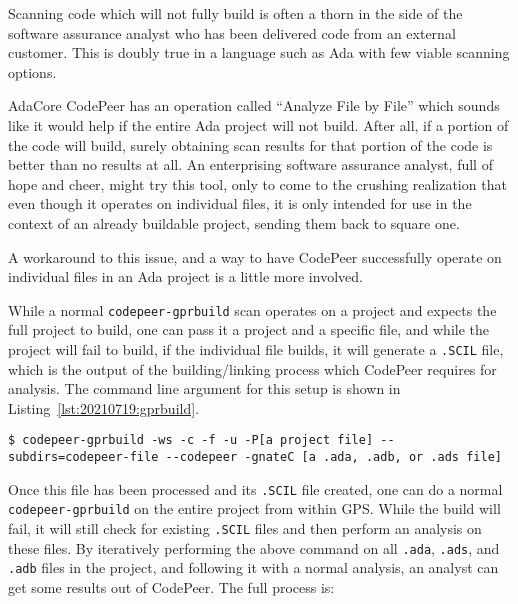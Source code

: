 Scanning code which will not fully build is often a thorn in the side of the software assurance analyst who has been delivered code from an external customer.  This is doubly true in a language such as Ada with few viable scanning options.

AdaCore CodePeer has an operation called ``Analyze File by File'' which sounds like it would help if the entire Ada project will not build.  After all, if a portion of the code will build, surely obtaining scan results for that portion of the code is better than no results at all.  An enterprising software assurance analyst, full of hope and cheer, might try this tool, only to come to the crushing realization that even though it operates on individual files, it is only intended for use in the context of an already buildable project, sending them back to square one.

A workaround to this issue, and a way to have CodePeer successfully operate on individual files in an Ada project is a little more involved.

While a normal \texttt{codepeer-gprbuild} scan operates on a project and expects the full project to build, one can pass it a project and a specific file, and while the project will fail to build, if the individual file builds, it will generate a \texttt{.SCIL} file, which is the output of the building/linking process which CodePeer requires for analysis.  The command line argument for this setup is shown in Listing~\ref{lst:20210719:gprbuild}.
\begin{lstlisting}[caption={CodePeer GPRBuild Setup},captionpos=b,style=BashStyle,basicstyle=\small,label={lst:20210719:gprbuild},literate=*{-}{-}1,breaklines=true]
$ codepeer-gprbuild -ws -c -f -u -P[a project file] --subdirs=codepeer-file --codepeer -gnateC [a .ada, .adb, or .ads file]
\end{lstlisting}

Once this file has been processed and its \texttt{.SCIL} file created, one can do a normal \texttt{codepeer-gprbuild} on the entire project from within GPS.  While the build will fail, it will still check for existing \texttt{.SCIL} files and then perform an analysis on these files.  By iteratively performing the above command on all \texttt{.ada}, \texttt{.ads}, and \texttt{.adb} files in the project, and following it with a normal analysis, an analyst can get some results out of CodePeer.  The full process is:

